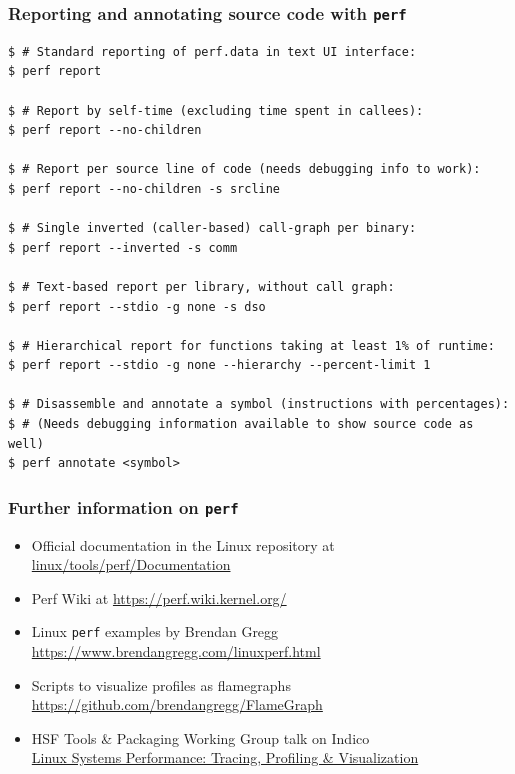 \begin{frame}[fragile]
  \frametitle{Reporting and annotating source code with \texttt{perf}}
  { \scriptsize
    \begin{block}{}
      \begin{verbatim}
$ # Standard reporting of perf.data in text UI interface:
$ perf report

$ # Report by self-time (excluding time spent in callees):
$ perf report --no-children

$ # Report per source line of code (needs debugging info to work):
$ perf report --no-children -s srcline

$ # Single inverted (caller-based) call-graph per binary:
$ perf report --inverted -s comm

$ # Text-based report per library, without call graph:
$ perf report --stdio -g none -s dso

$ # Hierarchical report for functions taking at least 1% of runtime:
$ perf report --stdio -g none --hierarchy --percent-limit 1

$ # Disassemble and annotate a symbol (instructions with percentages):
$ # (Needs debugging information available to show source code as well)
$ perf annotate <symbol>
      \end{verbatim}
    \end{block}
  }
\end{frame}

\begin{frame}[fragile]
  \frametitle{Further information on \texttt{perf}}
  \begin{itemize}
    \item Official documentation in the Linux repository at
    \href{https://git.kernel.org/pub/scm/linux/kernel/git/torvalds/linux.git/tree/tools/perf/Documentation}
         {linux/tools/perf/Documentation}
    \item Perf Wiki at \url{https://perf.wiki.kernel.org/}
    \item Linux \texttt{perf} examples by Brendan Gregg
          \url{https://www.brendangregg.com/linuxperf.html}
    \item Scripts to visualize profiles as flamegraphs
          \url{https://github.com/brendangregg/FlameGraph}
    \item HSF Tools \& Packaging Working Group talk on Indico\\
          \href{https://indico.cern.ch/event/974382/}
          {Linux Systems Performance: Tracing, Profiling \& Visualization}
  \end{itemize}
\end{frame}

